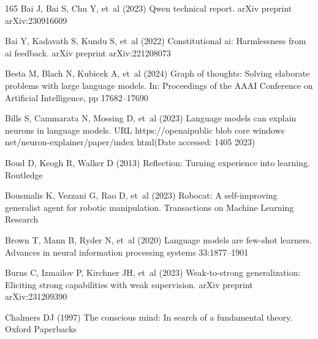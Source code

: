 \documentclass[sn-basic, Numbered]{sn-jnl}%
\theoremstyle{thmstyleone}%
\theoremstyle{thmstyletwo}%
\theoremstyle{thmstylethree}%
\begin{document}
\begin{thebibliography}{165}
Bai J, Bai S, Chu Y, et~al (2023) Qwen technical report. arXiv preprint arXiv:230916609

Bai Y, Kadavath S, Kundu S, et~al (2022) Constitutional ai: Harmlessness from ai feedback. arXiv preprint arXiv:221208073

Besta M, Blach N, Kubicek A, et~al (2024) Graph of thoughts: Solving elaborate problems with large language models. In: Proceedings of the AAAI Conference on Artificial Intelligence, pp 17682--17690

Bills S, Cammarata N, Mossing D, et~al (2023) Language models can explain neurons in language models. URL https://openaipublic blob core windows net/neuron-explainer/paper/index html(Date accessed: 1405 2023)

Boud D, Keogh R, Walker D (2013) Reflection: Turning experience into learning. Routledge

Bousmalis K, Vezzani G, Rao D, et~al (2023) Robocat: A self-improving generalist agent for robotic manipulation. Transactions on Machine Learning Research

Brown T, Mann B, Ryder N, et~al (2020) Language models are few-shot learners. Advances in neural information processing systems 33:1877--1901

Burns C, Izmailov P, Kirchner JH, et~al (2023) Weak-to-strong generalization: Eliciting strong capabilities with weak supervision. arXiv preprint arXiv:231209390

Chalmers DJ (1997) The conscious mind: In search of a fundamental theory. Oxford Paperbacks


\end{thebibliography}
\end{document}
